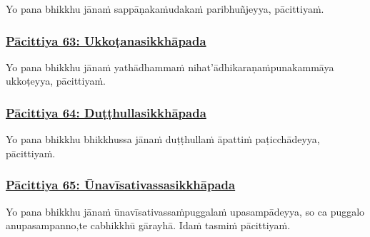Yo pana bhikkhu jānaṁ sappāṇakaṁ\makeatletter\hyperlink{endnote347-appendix}\makeatother \thinspace udakaṁ paribhuñjeyya, pācittiyaṁ.



\subsubsection*{\hyperref[exp63]{Pācittiya 63: Ukkoṭanasikkhāpada}}
\label{pac63}

Yo pana bhikkhu jānaṁ yathādhammaṁ nihat'ādhikaraṇaṁ\makeatletter\hyperlink{endnote348-appendix}\makeatother \thinspace punakammāya ukkoṭeyya, pācittiyaṁ.



\subsubsection*{\hyperref[exp64]{Pācittiya 64: Duṭṭhullasikkhāpada}}
\label{pac64}

Yo pana bhikkhu bhikkhussa jānaṁ duṭṭhullaṁ āpattiṁ paṭicchādeyya, pācittiyaṁ.



\subsubsection*{\hyperref[exp65]{Pācittiya 65: Ūnavīsativassasikkhāpada}}
\label{pac65}

Yo pana bhikkhu jānaṁ ūnavīsativassaṁ\makeatletter\hyperlink{endnote349-appendix}\makeatother \thinspace puggalaṁ upasampādeyya, so ca puggalo anupasampanno,\makeatletter\hyperlink{endnote350-appendix}\makeatother \thinspace te ca\makeatletter\hyperlink{endnote351-appendix}\makeatother \thinspace bhikkhū gārayhā. Idaṁ tasmiṁ pācittiyaṁ.



